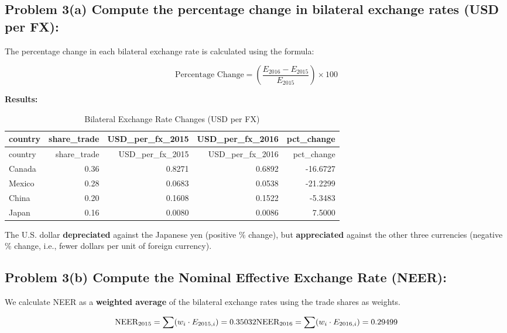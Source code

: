 \documentclass[
]{article}
\begin{document}
\subsection{Problem 3(a) Compute the percentage change in bilateral
exchange rates (USD per
FX):}\label{problem-3a-compute-the-percentage-change-in-bilateral-exchange-rates-usd-per-fx}

The percentage change in each bilateral exchange rate is calculated
using the formula:

\[
\text{Percentage Change} = \left( \frac{E_{2016} - E_{2015}}{E_{2015}} \right) \times 100
\]

\textbf{Results:}

\begin{longtable}[]{@{}lrrrr@{}}
\caption{Bilateral Exchange Rate Changes (USD per FX)}\tabularnewline
\toprule\noalign{}
country & share\_trade & USD\_per\_fx\_2015 & USD\_per\_fx\_2016 &
pct\_change \\
\midrule\noalign{}
\endfirsthead
\toprule\noalign{}
country & share\_trade & USD\_per\_fx\_2015 & USD\_per\_fx\_2016 &
pct\_change \\
\midrule\noalign{}
\endhead
\bottomrule\noalign{}
\endlastfoot
Canada & 0.36 & 0.8271 & 0.6892 & -16.6727 \\
Mexico & 0.28 & 0.0683 & 0.0538 & -21.2299 \\
China & 0.20 & 0.1608 & 0.1522 & -5.3483 \\
Japan & 0.16 & 0.0080 & 0.0086 & 7.5000 \\
\end{longtable}

The U.S. dollar \textbf{depreciated} against the Japanese yen (positive
\% change), but \textbf{appreciated} against the other three currencies
(negative \% change, i.e., fewer dollars per unit of foreign currency).

\subsection{Problem 3(b) Compute the Nominal Effective Exchange Rate
(NEER):}\label{problem-3b-compute-the-nominal-effective-exchange-rate-neer}

We calculate NEER as a \textbf{weighted average} of the bilateral
exchange rates using the trade shares as weights.

\[
\text{NEER}_{2015} = \sum (w_i \cdot E_{2015,i}) = 0.35032 \\
\text{NEER}_{2016} = \sum (w_i \cdot E_{2016,i}) = 0.29499
\]
\end{document}
